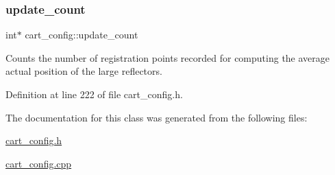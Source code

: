 \subsubsection{\texorpdfstring{update\+\_\+count}{update\_count}}
{\footnotesize\ttfamily int$\ast$ cart\+\_\+config\+::update\+\_\+count\hspace{0.3cm}{\ttfamily [private]}}

Counts the number of registration points recorded for computing the average actual position of the large reflectors. 

Definition at line 222 of file cart\+\_\+config.\+h.



The documentation for this class was generated from the following files\+:\begin{DoxyCompactItemize}
\item 
\mbox{\hyperlink{cart__config_8h}{cart\+\_\+config.\+h}}\item 
\mbox{\hyperlink{cart__config_8cpp}{cart\+\_\+config.\+cpp}}\end{DoxyCompactItemize}

